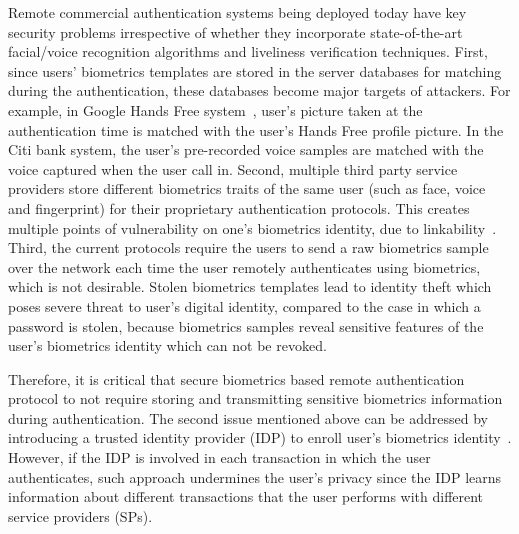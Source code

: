 \documentclass[10pt]{article}
\begin{document}
Remote commercial authentication systems being deployed today have key security problems irrespective of whether they incorporate state-of-the-art facial/voice recognition algorithms and liveliness verification techniques. 
First, since users' biometrics templates are stored in the server databases for matching during the authentication, these databases become major targets 
of attackers.
For example, in Google Hands Free system~\cite{google}, user's picture taken at the authentication time is matched with the user's Hands Free 
profile picture. In the Citi bank system, the user's pre-recorded voice samples are matched with the voice captured when the user call in. Second, 
multiple third party service providers store different biometrics traits of the same user (such as face, voice and fingerprint) for their 
proprietary authentication protocols. This creates multiple points of vulnerability on one's biometrics identity, due to 
linkability~\cite{linkability}. Third, the current protocols require the users to send a raw biometrics sample over the network each time the user 
remotely authenticates using biometrics, which is not desirable. 
Stolen biometrics templates lead to identity theft which poses severe threat to user's 
digital identity, compared to the case in which a password is stolen, because biometrics samples reveal sensitive features of the user's 
biometrics identity which can not be revoked.

Therefore, it is critical that secure biometrics 
based remote authentication protocol to not require storing and transmitting sensitive biometrics information during authentication.
The second issue mentioned above can be addressed by introducing a trusted identity provider (IDP) to enroll user's biometrics identity~\cite{google, 
identityX}. However, if the IDP is involved in each transaction in which the user authenticates, such approach undermines the user's privacy since the IDP learns information 
about different transactions that the user performs with different service providers (SPs).
  
\end{document}
